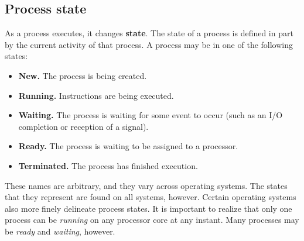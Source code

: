 \subsection*{Process state}\label{sec:3.1:process_state}
As a process executes, it changes \textbf{state}. The state of a process is defined in part by the current activity of that process. A process may be in one of the following states:
\begin{itemize}
    \item \textbf{New.} The process is being created.
    \item \textbf{Running.} Instructions are being executed.
    \item \textbf{Waiting.} The process is waiting for some event to occur (such as an I/O completion or reception of a signal).
    \item \textbf{Ready.} The process is waiting to be assigned to a processor.
    \item \textbf{Terminated.} The process has finished execution.
\end{itemize}
These names are arbitrary, and they vary across operating systems. The states that they represent are found on all systems, however. Certain operating systems also more finely delineate process states. It is important to realize that only one process can be \textit{running} on any processor core at any instant. Many processes may be \textit{ready} and \textit{waiting}, however.

